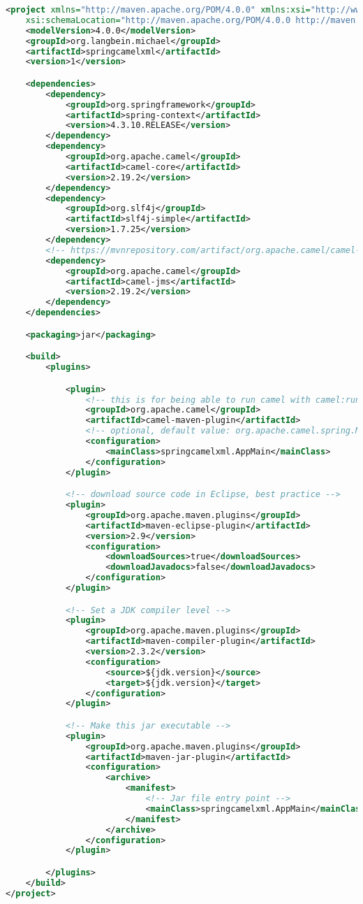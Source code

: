 \begin{lstlisting}[language=xml, name=pom.xml]
<project xmlns="http://maven.apache.org/POM/4.0.0" xmlns:xsi="http://www.w3.org/2001/XMLSchema-instance"
	xsi:schemaLocation="http://maven.apache.org/POM/4.0.0 http://maven.apache.org/xsd/maven-4.0.0.xsd">
	<modelVersion>4.0.0</modelVersion>
	<groupId>org.langbein.michael</groupId>
	<artifactId>springcamelxml</artifactId>
	<version>1</version>

	<dependencies>
		<dependency>
			<groupId>org.springframework</groupId>
			<artifactId>spring-context</artifactId>
			<version>4.3.10.RELEASE</version>
		</dependency>
		<dependency>
			<groupId>org.apache.camel</groupId>
			<artifactId>camel-core</artifactId>
			<version>2.19.2</version>
		</dependency>
		<dependency>
			<groupId>org.slf4j</groupId>
			<artifactId>slf4j-simple</artifactId>
			<version>1.7.25</version>
		</dependency>
		<!-- https://mvnrepository.com/artifact/org.apache.camel/camel-jms -->
		<dependency>
			<groupId>org.apache.camel</groupId>
			<artifactId>camel-jms</artifactId>
			<version>2.19.2</version>
		</dependency>
	</dependencies>

	<packaging>jar</packaging>

	<build>
		<plugins>

			<plugin>
				<!-- this is for being able to run camel with camel:run -->
				<groupId>org.apache.camel</groupId>
				<artifactId>camel-maven-plugin</artifactId>
				<!-- optional, default value: org.apache.camel.spring.Main -->
				<configuration>
					<mainClass>springcamelxml.AppMain</mainClass>
				</configuration>
			</plugin>

			<!-- download source code in Eclipse, best practice -->
			<plugin>
				<groupId>org.apache.maven.plugins</groupId>
				<artifactId>maven-eclipse-plugin</artifactId>
				<version>2.9</version>
				<configuration>
					<downloadSources>true</downloadSources>
					<downloadJavadocs>false</downloadJavadocs>
				</configuration>
			</plugin>

			<!-- Set a JDK compiler level -->
			<plugin>
				<groupId>org.apache.maven.plugins</groupId>
				<artifactId>maven-compiler-plugin</artifactId>
				<version>2.3.2</version>
				<configuration>
					<source>${jdk.version}</source>
					<target>${jdk.version}</target>
				</configuration>
			</plugin>

			<!-- Make this jar executable -->
			<plugin>
				<groupId>org.apache.maven.plugins</groupId>
				<artifactId>maven-jar-plugin</artifactId>
				<configuration>
					<archive>
						<manifest>
							<!-- Jar file entry point -->
							<mainClass>springcamelxml.AppMain</mainClass>
						</manifest>
					</archive>
				</configuration>
			</plugin>

		</plugins>
	</build>
</project>
\end{lstlisting}

